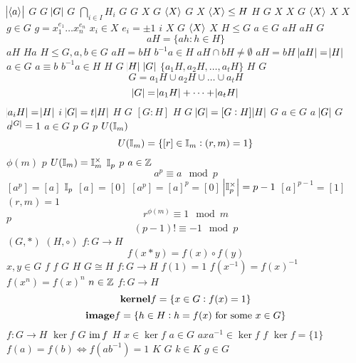 \documentclass{article}
\begin{document}
$\abs{\langle a\rangle}$
$G$
$G$
$\abs{G}$
$G$
$\bigcap_{i\in I}H_i$
$G$
$G$
$X$
$G$
$\langle X\rangle$
$G$
$X$
$\langle X\rangle\le H$
$H$
$G$
$X$
$X$
$G$
$\langle X\rangle$
$X$
$X$
$g\in G$
$g=x_1^{e_1}\dots
   x_n^{e_n}$
$x_i\in X$
$e_i=\pm 1$
$i$
$X$
$G$
$\langle X\rangle$
$X$
$H\le G$
$a\in G$
$aH$
$aH$
$G$
\begin{equation*}
   aH=\{ah:h\in H\}
   \end{equation*}
$aH$
$Ha$
$H\le G,a,b\in G$
$aH=bH$
$b^{-1}a\in H$
$aH\cap bH\neq\emptyset$
$aH=bH$
$\abs{aH}=\abs{H}$
$a\in G$
$a\equiv b$
$b^{-1}a\in H$
$H$
$G$
$\abs{H}$
$\abs{G}$
$\{a_1H,a_2H,\dots,a_tH\}$
$H$
$G$
\begin{equation*}
   G=a_1H\cup a_2H\cup\dots\cup a_tH
   \end{equation*}
\begin{equation*}
   \abs{G}=\abs{a_1H}+\dots+\abs{a_tH}
   \end{equation*}
$\abs{a_iH}=\abs{H}$
$i$
$\abs{G}=t\abs{H}$
$H$
$G$
$[G:H]$
$H$
$G$
$\abs{G}=[G:H]\abs{H}$
$G$
$a\in G$
$a$
$\abs{G}$
$G$
$a^{\abs{G}}=1$
$a\in G$
$p$
$G$
$p$
$U(\mathbb{I}_m)$
\begin{equation*}
    U(\mathbb{I}_m)=\{[r]\in\mathbb{I}_m:(r,m)=1\}
   \end{equation*}
$\phi(m)$
$p$
$U(\mathbb{I}_m)=\mathbb{I}_m^{\times}$
$\mathbb{I}_p$
$p$
$a\in\mathbb{Z}$
\begin{equation*}
   a^p\equiv a\mod p
   \end{equation*}
$[a^p]=[a]$
$\mathbb{I}_p$
$[a]=[0]$
$[a^p]=[a]^p=[0]$
$\abs{\mathbb{I}_p^\times}=p-1$
$[a]^{p-1}=[1]$
$(r,m)=1$
\begin{equation*}
   r^{\phi(m)}\equiv 1\mod m
   \end{equation*}
$p$
\begin{equation*}
   (p-1)!\equiv -1\mod p
   \end{equation*}
$(G,*)$
$(H,\circ)$
$f:G\to H$
\begin{equation*}
   f(x*y)=f(x)\circ f(y)
   \end{equation*}
$x,y\in G$
$f$
$f$
$G$
$H$
$G\cong H$
$f:G\to H$
$f(1)=1$
$f(x^{-1})=f(x)^{-1}$
$f(x^n)=f(x)^n$
$n\in\mathbb{Z}$
$f:G\to H$
\begin{equation*}
   \textbf{kernel}f=\{x\in G:f(x)=1\}
   \end{equation*}
\begin{equation*}
   \textbf{image}f=\{h\in H:h=f(x)\text{ for some } x\in G\}
   \end{equation*}
$f:G\to H$
$\ker f$
$G$
$\operatorname{im} f$
$H$
$x\in\ker f$
$a\in G$
$axa^{-1}\in\ker f$
$f$
$\ker f=\{1\}$
$f(a)=f(b)\Leftrightarrow f(ab^{-1})=1$
$K$
$G$
$k\in K$
$g\in G$
\end{document}
